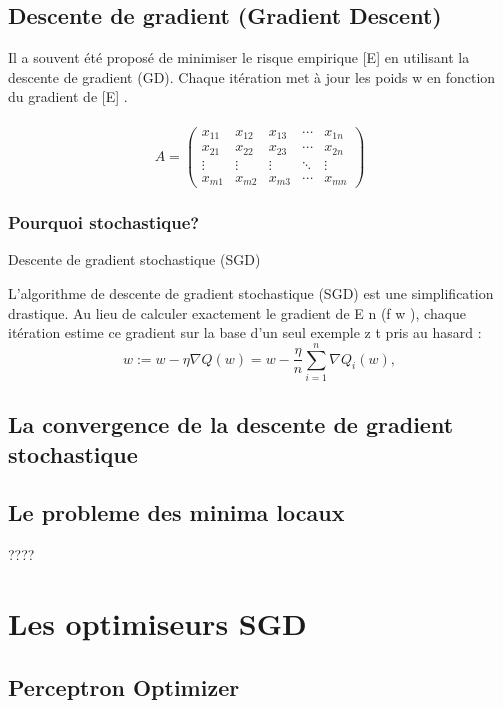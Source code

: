 	\subsection{Descente de gradient (Gradient Descent)}
	
	
	Il a souvent été proposé de minimiser le risque empirique [E] en utilisant la descente de gradient (GD). Chaque itération met à jour les poids w en fonction du gradient de [E] \cite{bottou2012stochastic}.\\
	
	\lipsum[1] \\ 
	
	$$A = \begin{pmatrix}
		x_{11} & x_{12} & x_{13} & \cdots & x_{1n} \\
		x_{21} & x_{22} & x_{23} & \cdots & x_{2n} \\
		\vdots & \vdots & \vdots & \ddots & \vdots \\
		x_{m1} & x_{m2} & x_{m3} & \cdots & x_{mn} 
	\end{pmatrix}$$
	
	
	\lipsum[4]
	\subsubsection{Pourquoi stochastique?}
	Descente de gradient stochastique (SGD) 
	
	L'algorithme de descente de gradient stochastique (SGD) est une simplification drastique. Au lieu de calculer exactement le gradient de E n (f w ), chaque itération estime ce gradient sur la base d'un seul exemple z t pris au hasard \cite{bottou2012stochastic} :
	$$
	{\displaystyle w:=w-\eta \nabla Q(w)=w-{\frac {\eta }{n}}\sum _{i=1}^{n}\nabla Q_{i}(w),}
	$$
	\lipsum[1]	
	\subsection{La convergence de la descente de gradient stochastique}
	\lipsum[1]
	\subsection{Le probleme des minima locaux} \cite[page 291][]{antoine2018apprentissage}????
	
	
	\section{Les optimiseurs SGD}
	\subsection{Perceptron Optimizer}
	
